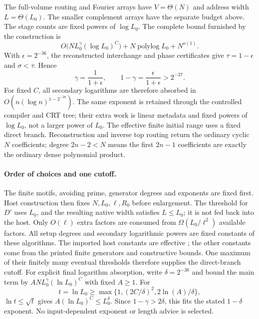 \documentclass[11pt]{article}
\newcommand{\polylog}{\operatorname{polylog}}
\begin{document}
The full-volume routing and Fourier arrays have $V=\Theta(N)$ and
address width $L=\Theta(L_0)$. The smaller complement arrays have
the separate budget above. The stage counts are fixed powers of $\log L_0$.
The complete bound furnished by the construction is
\[
 O\bigl(NL_0^\gamma(\log L_0)^C\bigr)
   +N\polylog L_0+N^{o(1)}.
\]
With $\epsilon=2^{-36}$, the reconstructed interchange and phase
certificates give $\tau=1-\epsilon$ and $\sigma<\tau$. Hence
\[
 \gamma=\frac1{1+\epsilon},\qquad
 1-\gamma=\frac{\epsilon}{1+\epsilon}>2^{-37}.
\]
For fixed $C$, all secondary logarithms are therefore absorbed in
$O(n(\log n)^{1-2^{-38}})$. The same exponent is retained through
the controlled compiler and CRT tree; their extra work is linear
metadata and fixed powers of $\log L_0$, not a larger power of $L_0$.
The effective finite initial range uses a fixed direct branch.
Reconstruction and inverse top routing return the ordinary cyclic
$N$ coefficients; degree $2n-2<N$ means the first $2n-1$ coefficients
are exactly the ordinary dense polynomial product.

\paragraph{Order of choices and one cutoff.}
The finite motifs, avoiding prime, generator degrees and exponents are
fixed first. Host construction then fixes $N,L_0,\ell,R_0$ before
enlargement. The threshold for $D'$ uses $L_0$, and the resulting
native width satisfies $L\le L_0$; it is not fed back into the host.
Only $O(\ell)$ extra factors are consumed from
$\Omega(L_0/\ell^2)$ available factors. All setup degrees and secondary
logarithmic powers are fixed constants of these algorithms.
The imported host constants are effective \cite[Section 1]{cyclomult};
the other constants come from the printed finite generators and
constructive bounds. One maximum of their finitely many eventual
thresholds therefore supplies the direct-branch cutoff.
For explicit final logarithm absorption, write $\delta=2^{-38}$ and
bound the main term by $ANL_0^\gamma(\ln L_0)^C$ with fixed $A\ge1$.
For
\[
 t=\ln L_0\ge\max\{1,(2C/\delta)^2,2\ln(A)/\delta\},
\]
$\ln t\le\sqrt t$ gives $A(\ln L_0)^C\le L_0^\delta$.
Since $1-\gamma>2\delta$, this fits the stated $1-\delta$ exponent.
No input-dependent exponent or length advice is selected.
\end{document}
